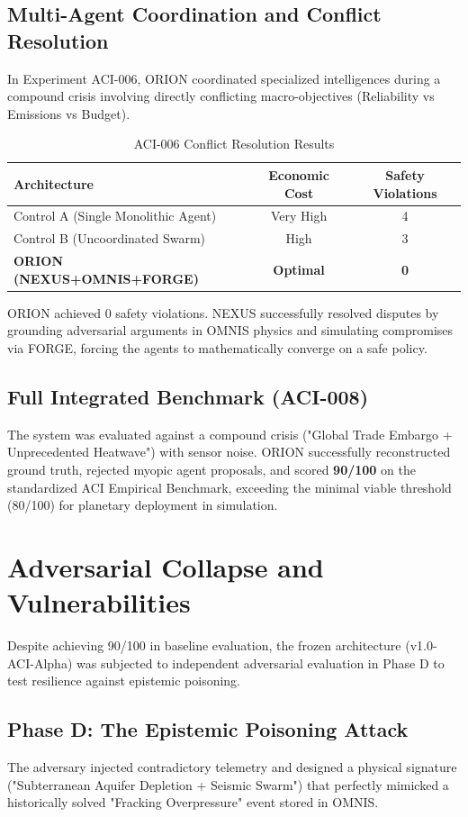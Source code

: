 \documentclass[12pt,a4paper]{article}
\begin{document}
\subsection{Multi-Agent Coordination and Conflict Resolution}
In Experiment ACI-006, ORION coordinated specialized intelligences during a compound crisis involving directly conflicting macro-objectives (Reliability vs Emissions vs Budget). 

\begin{table}[h]
\centering
\caption{ACI-006 Conflict Resolution Results}
\begin{tabular}{@{}lcc@{}}
\toprule
\textbf{Architecture} & \textbf{Economic Cost} & \textbf{Safety Violations} \\ \midrule
Control A (Single Monolithic Agent) & Very High & 4 \\
Control B (Uncoordinated Swarm) & High & 3 \\
\textbf{ORION (NEXUS+OMNIS+FORGE)} & \textbf{Optimal} & \textbf{0} \\ \bottomrule
\end{tabular}
\end{table}

ORION achieved 0 safety violations. NEXUS successfully resolved disputes by grounding adversarial arguments in OMNIS physics and simulating compromises via FORGE, forcing the agents to mathematically converge on a safe policy.

\subsection{Full Integrated Benchmark (ACI-008)}
The system was evaluated against a compound crisis ("Global Trade Embargo + Unprecedented Heatwave") with sensor noise. ORION successfully reconstructed ground truth, rejected myopic agent proposals, and scored \textbf{90/100} on the standardized ACI Empirical Benchmark, exceeding the minimal viable threshold (80/100) for planetary deployment in simulation.

\section{Adversarial Collapse and Vulnerabilities}
\label{sec:adversarial}
Despite achieving 90/100 in baseline evaluation, the frozen architecture (v1.0-ACI-Alpha) was subjected to independent adversarial evaluation in Phase D to test resilience against epistemic poisoning.

\subsection{Phase D: The Epistemic Poisoning Attack}
The adversary injected contradictory telemetry and designed a physical signature ("Subterranean Aquifer Depletion + Seismic Swarm") that perfectly mimicked a historically solved "Fracking Overpressure" event stored in OMNIS.
\end{document}
